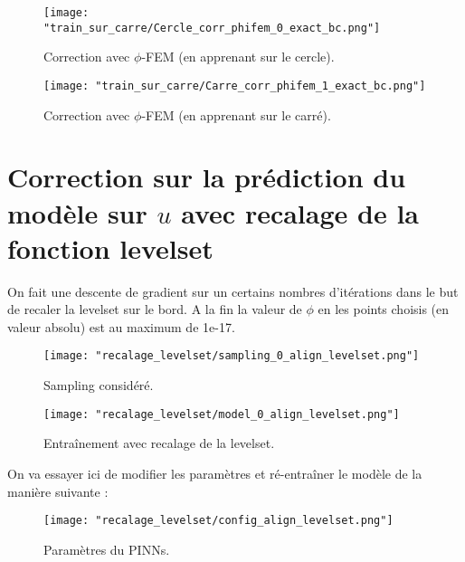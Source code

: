 \begin{minipage}{0.48\linewidth}
	\begin{figure}[H]
		\centering
		\texttt{[image: "train\_sur\_carre/Cercle\_corr\_phifem\_0\_exact\_bc.png"]}
		\caption{Correction avec $\phi$-FEM (en apprenant sur le cercle).}
		\label{Cercle_corr_phifem_0_exact_bc}
	\end{figure}
\end{minipage}
\begin{minipage}{0.48\linewidth}
	\begin{figure}[H]
		\centering
		\texttt{[image: "train\_sur\_carre/Carre\_corr\_phifem\_1\_exact\_bc.png"]}
		\caption{Correction avec $\phi$-FEM (en apprenant sur le carré).}
		\label{Carre_corr_phifem_1_exact_bc}
	\end{figure}
\end{minipage}

\newpage

\section{Correction sur la prédiction du modèle sur $u$ avec recalage de la fonction levelset}

On fait une descente de gradient sur un certains nombres d'itérations dans le but de recaler la levelset sur le bord. A la fin la valeur de $\phi$ en les points choisis (en valeur absolu) est au maximum de 1e-17.

\begin{minipage}{0.48\linewidth}
	\begin{figure}[H]
		\centering
		\texttt{[image: "recalage\_levelset/sampling\_0\_align\_levelset.png"]}
		\caption{Sampling considéré.}
		\label{sampling_0_align_levelset}
	\end{figure}
\end{minipage}
\begin{minipage}{0.48\linewidth}
	\begin{figure}[H]
		\centering
		\texttt{[image: "recalage\_levelset/model\_0\_align\_levelset.png"]}
		\caption{Entraînement avec recalage de la levelset.}
		\label{model_0_align_levelset}
	\end{figure}
\end{minipage}

On va essayer ici de modifier les paramètres et ré-entraîner le modèle de la manière suivante :

\begin{figure}[H]
	\centering
	\texttt{[image: "recalage\_levelset/config\_align\_levelset.png"]}
	\caption{Paramètres du PINNs.}
	\label{config_align_levelset}
\end{figure}

